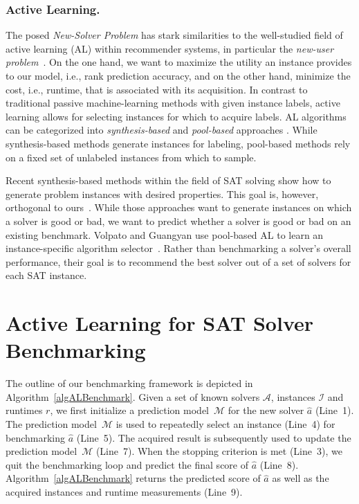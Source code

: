 \documentclass[runningheads]{llncs}
\begin{document}
\subsubsection{Active Learning.}

The posed \emph{New-Solver Problem} has stark similarities to the well-studied field of active learning (AL) within recommender systems, in particular the \emph{new-user problem}~\cite{RubensESK15}.
On the one hand, we want to maximize the utility an instance provides to our model, i.e., rank prediction accuracy, and on the other hand, minimize the cost, i.e., runtime, that is associated with its acquisition.
In contrast to traditional passive machine-learning methods with given instance labels, active learning allows for selecting instances for which to acquire labels.
AL algorithms can be categorized into \emph{synthesis-bas\-ed} \cite{0001AEMN22,GarzonMG22,2019gaal} and \emph{pool-bas\-ed} approaches \cite{GolbandiKL11,HarpaleY08,KorenBV09}.
While synthesis-based methods generate instances for labeling, pool-based methods rely on a fixed set of unlabeled instances from which to sample.

Recent synthesis-based methods within the field of SAT solving show how to generate problem instances with desired properties.
This goal is, however, orthogonal to ours~\cite{0001AEMN22,GarzonMG22}.
While those approaches want to generate instances on which a solver is good or bad, we want to predict whether a solver is good or bad on an existing benchmark.
Volpato and Guangyan use pool-based AL to learn an instance-specific algorithm selector~\cite{volpato2019active}.
Rather than benchmarking a solver's overall performance, their goal is to recommend the best solver out of a set of solvers for each SAT instance.

\section{Active Learning for SAT Solver Benchmarking}
\label{sec:main}

The outline of our benchmarking framework is depicted in Algorithm~\ref{algALBenchmark}. 
Given a set of known solvers $\mathcal{A}$, instances $\mathcal{I}$ and runtimes $r$, we first initialize a prediction model~$\mathcal{M}$ for the new solver $\hat a$ (Line~1).
The prediction model~$\mathcal{M}$ is used to repeatedly select an instance (Line~4) for benchmarking $\hat a$ (Line~5). 
The acquired result is subsequently used to update the prediction model~$\mathcal{M}$ (Line~7). 
When the stopping criterion is met (Line~3), we quit the benchmarking loop and predict the final score of $\hat a$ (Line~8). 
Algorithm~\ref{algALBenchmark} returns the predicted score of $\hat a$ as well as the acquired instances and runtime measurements (Line~9). 
\end{document}
